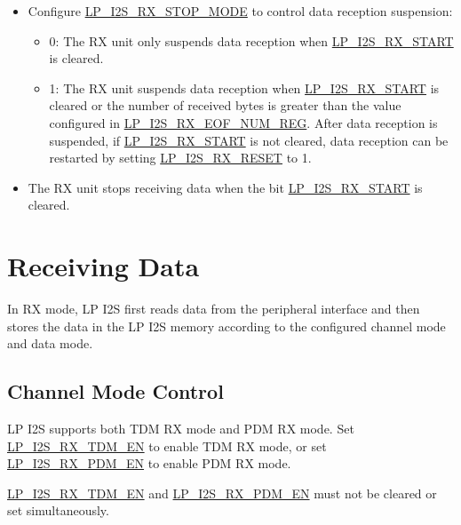 \documentclass[main\_\_EN.tex]{subfiles}
\begin{document}
\begin{itemize}
\begin{itemize}
        \item Configure \hyperref[fielddesc:LPI2SRXSTOPMODE]{LP\_I2S\_RX\_STOP\_MODE} to control data reception suspension:
        \begin{itemize}
            \item 0: The RX unit only suspends data reception when \hyperref[fielddesc:LPI2SRXSTART]{LP\_I2S\_RX\_START} is cleared.
            \item 1: The RX unit suspends data reception when \hyperref[fielddesc:LPI2SRXSTART]{LP\_I2S\_RX\_START} is cleared or the number of received bytes is greater than the value configured in \hyperref[regdesc:LPI2SRXEOFNUMREG]{LP\_I2S\_RX\_EOF\_NUM\_REG}. After data reception is suspended, if \hyperref[fielddesc:LPI2SRXSTART]{LP\_I2S\_RX\_START} is not cleared, data reception can be restarted by setting \hyperref[fielddesc:LPI2SRXRESET]{LP\_I2S\_RX\_RESET} to 1.
        \end{itemize}
        \item The RX unit stops receiving data when the bit \hyperref[fielddesc:LPI2SRXSTART]{LP\_I2S\_RX\_START} is cleared.
    \end{itemize}
\end{itemize}


\section{Receiving Data}\label{sec:lpi2s-rx-data}

In RX mode, LP I2S first reads data from the peripheral interface and then stores the data in the LP I2S memory according to the configured channel mode and data mode.

\subsection{Channel Mode Control}

\chipname{} LP I2S supports both TDM RX mode and PDM RX mode. Set \hyperref[fielddesc:LPI2SRXTDMEN]{LP\_I2S\_RX\_TDM\_EN} to enable TDM RX mode, or set \hyperref[fielddesc:LPI2SRXPDMEN]{LP\_I2S\_RX\_PDM\_EN} to enable PDM RX mode.

\begin{tiplisting}
\hyperref[fielddesc:LPI2SRXTDMEN]{LP\_I2S\_RX\_TDM\_EN} and \hyperref[fielddesc:LPI2SRXPDMEN]{LP\_I2S\_RX\_PDM\_EN} must not be cleared or set simultaneously.
\end{tiplisting}
\vspace{-1em}
\end{document}
